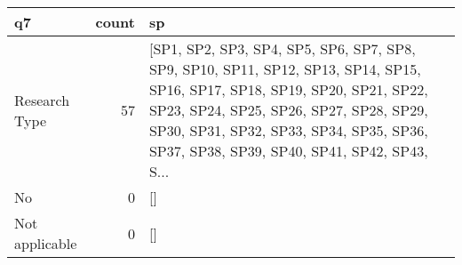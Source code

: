 \begin{tabular}{lrl}
\toprule
             q7 &  count &                                                                                                                                                                                                                                                              sp \\
\midrule
  Research Type &     57 &  [SP1, SP2, SP3, SP4, SP5, SP6, SP7, SP8, SP9, SP10, SP11, SP12, SP13, SP14, SP15, SP16, SP17, SP18, SP19, SP20, SP21, SP22, SP23, SP24, SP25, SP26, SP27, SP28, SP29, SP30, SP31, SP32, SP33, SP34, SP35, SP36, SP37, SP38, SP39, SP40, SP41, SP42, SP43, S... \\
             No &      0 &                                                                                                                                                                                                                                                              [] \\
 Not applicable &      0 &                                                                                                                                                                                                                                                              [] \\
\bottomrule
\end{tabular}
